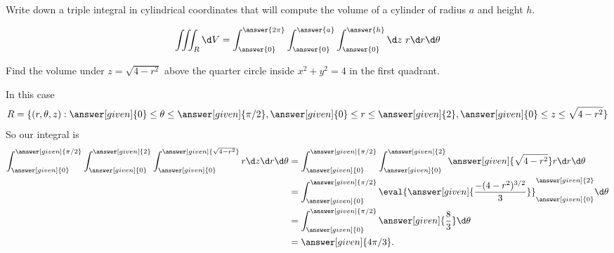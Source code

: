 \documentclass{ximera}
\begin{document}
\begin{question}
  Write down a triple integral in cylindrical coordinates that will
  compute the volume of a cylinder of radius $a$ and height $h$.
  \begin{prompt}
  \[
  \iiint_R \d V = \int_{\answer{0}}^{\answer{2\pi}}
  \int_{\answer{0}}^{\answer{a}}
  \int_{\answer{0}}^{\answer{h}}
  \d z \ r \d r \d \theta 
  \]
  \end{prompt}
\end{question}


\begin{example}
  Find the volume under $z= \sqrt{4-r^2}$ above the quarter circle
  inside $x^2 + y^2 = 4$ in the first quadrant.
  \begin{explanation}
    In this case
    \[
    R=\{(r,\theta,z):\answer[given]{0}\leq\theta\leq\answer[given]{\pi/2}, \answer[given]{0}\leq r\leq \answer[given]{2}, \answer[given]{0}\le z\le \sqrt{4-r^2}\}
    \]
    So our integral is
    \begin{align*}
      \int_{\answer[given]{0}}^{\answer[given]{\pi/2}}
      \int_{\answer[given]{0}}^{\answer[given]{2}}
      \int_{\answer[given]{0}}^{\answer[given]{\sqrt{4-r^2}}} r \d z \d r \d \theta
      &=
      \int_{\answer[given]{0}}^{\answer[given]{\pi/2}}
      \int_{\answer[given]{0}}^{\answer[given]{2}}
      \answer[given]{\sqrt{4-r^2}} r \d r \d \theta\\
      &=\int_{\answer[given]{0}}^{\answer[given]{\pi/2}}
      \eval{\answer[given]{\frac{-(4-r^2)^{3/2}}{3}}}_{\answer[given]{0}}^{\answer[given]{2}}  \d \theta\\
      &=\int_{\answer[given]{0}}^{\answer[given]{\pi/2}}
      \answer[given]{\frac{8}{3}}  \d \theta\\
      &=\answer[given]{4\pi/3}.
    \end{align*}
  \end{explanation}
\end{example}
\end{document}
